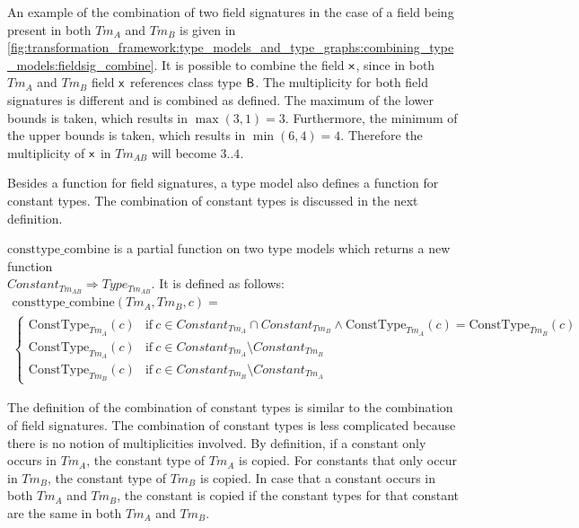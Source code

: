 An example of the combination of two field signatures in the case of a field being present in both $Tm_A$ and $Tm_B$ is given in \cref{fig:transformation_framework:type_models_and_type_graphs:combining_type_models:fieldsig_combine}. It is possible to combine the field $\mathsf{x}$, since in both $Tm_A$ and $Tm_B$ field $\mathsf{x}$ references class type $\mathsf{B}$. The multiplicity for both field signatures is different and is combined as defined. The maximum of the lower bounds is taken, which results in $\max(3, 1) = 3$. Furthermore, the minimum of the upper bounds is taken, which results in $\min(6, 4) = 4$. Therefore the multiplicity of $\mathsf{x}$ in $Tm_{AB}$ will become $3..4$.

Besides a function for field signatures, a type model also defines a function for constant types. The combination of constant types is discussed in the next definition.

\begin{defin}
\label{defin:transformation_framework:type_models_and_type_graphs:combining_type_models:consttype_combine}
$\mathrm{consttype\_\!combine}$ is a partial function on two type models which returns a new function \\$Constant_{Tm_{AB}} \Rightarrow Type_{Tm_{AB}}$. It is defined as follows:
\begin{multline*}
    \mathrm{consttype\_\!combine}(Tm_{A}, Tm_{B}, c) = \\
        \begin{cases}
        \mathrm{ConstType}_{Tm_A}(c) & \mathrm{if}\ c \in Constant_{Tm_A} \cap Constant_{Tm_B} \land \mathrm{ConstType}_{Tm_A}(c) = \mathrm{ConstType}_{Tm_B}(c) \\
        \mathrm{ConstType}_{Tm_A}(c) & \mathrm{if}\ c \in Constant_{Tm_A} \setminus Constant_{Tm_B} \\
        \mathrm{ConstType}_{Tm_B}(c) & \mathrm{if}\ c \in Constant_{Tm_B} \setminus Constant_{Tm_A}
    \end{cases}
\end{multline*}
\end{defin}

The definition of the combination of constant types is similar to the combination of field signatures. The combination of constant types is less complicated because there is no notion of multiplicities involved. By definition, if a constant only occurs in $Tm_{A}$, the constant type of $Tm_{A}$ is copied. For constants that only occur in $Tm_{B}$, the constant type of $Tm_{B}$ is copied. In case that a constant occurs in both $Tm_{A}$ and $Tm_{B}$, the constant is copied if the constant types for that constant are the same in both $Tm_{A}$ and $Tm_{B}$.

